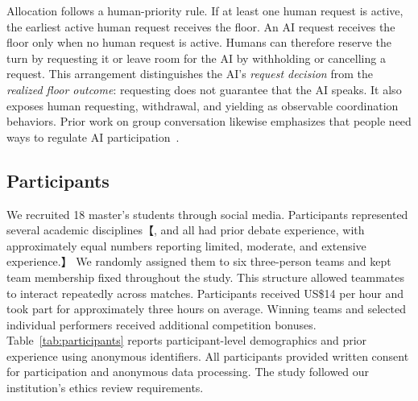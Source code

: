 \documentclass[manuscript,review,anonymous]{acmart}
\begin{document}
Allocation follows a human-priority rule. If at least one human request is active, the earliest active human request receives the floor. An AI request receives the floor only when no human request is active. Humans can therefore reserve the turn by requesting it or leave room for the AI by withholding or cancelling a request. This arrangement distinguishes the AI's \emph{request decision} from the \emph{realized floor outcome}: requesting does not guarantee that the AI speaks. It also exposes human requesting, withdrawal, and yielding as observable coordination behaviors. Prior work on group conversation likewise emphasizes that people need ways to regulate AI participation~\cite{houde2025controlling}.

\subsection{Participants}

We recruited 18 master's students through social media. Participants represented several academic disciplines【, and all had prior debate experience, with approximately equal numbers reporting limited, moderate, and extensive experience.】 We randomly assigned them to six three-person teams and kept team membership fixed throughout the study. This structure allowed teammates to interact repeatedly across matches. Participants received US\$14 per hour and took part for approximately three hours on average. Winning teams and selected individual performers received additional competition bonuses. Table~\ref{tab:participants} reports participant-level demographics and prior experience using anonymous identifiers. All participants provided written consent for participation and anonymous data processing. The study followed our institution's ethics review requirements.
\end{document}
